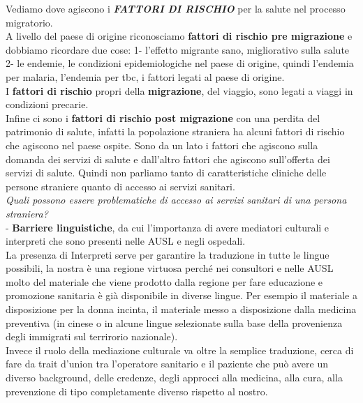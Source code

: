 Vediamo dove agiscono i \textbf{\emph{FATTORI DI RISCHIO}} per la salute
nel processo migratorio.\\
A livello del paese di origine riconosciamo \textbf{fattori di rischio
pre migrazione} e dobbiamo ricordare due cose: 1- l'effetto migrante
sano, migliorativo sulla salute 2- le endemie, le condizioni
epidemiologiche nel paese di origine, quindi l'endemia per malaria,
l'endemia per tbc, i fattori legati al paese di origine.\\
I \textbf{fattori di rischio} propri della \textbf{migrazione}, del
viaggio, sono legati a viaggi in condizioni precarie.\\
Infine ci sono i \textbf{fattori di rischio post migrazione} con una
perdita del patrimonio di salute, infatti la popolazione straniera ha
alcuni fattori di rischio che agiscono nel paese ospite. Sono da un lato
i fattori che agiscono sulla domanda dei servizi di salute e dall'altro
fattori che agiscono sull'offerta dei servizi di salute. Quindi non
parliamo tanto di caratteristiche cliniche delle persone straniere
quanto di accesso ai servizi sanitari.\\
\emph{Quali possono essere problematiche di accesso ai servizi sanitari
di una persona straniera?}\\
- \textbf{Barriere linguistiche}, da cui l'importanza di avere mediatori
culturali e interpreti che sono presenti nelle AUSL e negli ospedali.\\
La presenza di Interpreti serve per garantire la traduzione in tutte le
lingue possibili, la nostra è una regione virtuosa perché nei consultori
e nelle AUSL molto del materiale che viene prodotto dalla regione per
fare educazione e promozione sanitaria è già disponibile in diverse
lingue. Per esempio il materiale a disposizione per la donna incinta, il
materiale messo a disposizione dalla medicina preventiva (in cinese o in
alcune lingue selezionate sulla base della provenienza degli immigrati
sul terrirorio nazionale).\\
Invece il ruolo della mediazione culturale va oltre la semplice
traduzione, cerca di fare da trait d'union tra l'operatore sanitario e
il paziente che può avere un diverso background, delle credenze, degli
approcci alla medicina, alla cura, alla prevenzione di tipo
completamente diverso rispetto al nostro.

